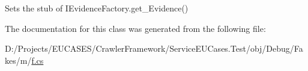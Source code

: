 Sets the stub of I\-Evidence\-Factory.\-get\-\_\-\-Evidence()



The documentation for this class was generated from the following file\-:\begin{DoxyCompactItemize}
\item 
D\-:/\-Projects/\-E\-U\-C\-A\-S\-E\-S/\-Crawler\-Framework/\-Service\-E\-U\-Cases.\-Test/obj/\-Debug/\-Fakes/m/\hyperlink{m_2f_8cs}{f.\-cs}\end{DoxyCompactItemize}
